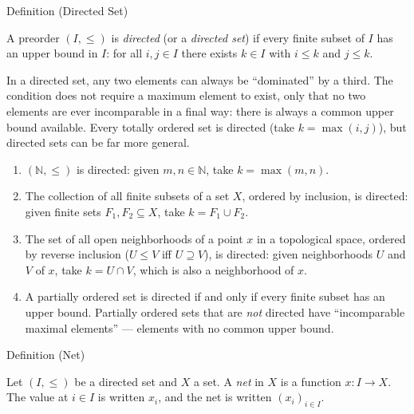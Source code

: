 \begin{definitionbox}{Definition (Directed Set)}
\begin{definition}\label{def:directed-set}
A preorder $(I, \leq)$ is \emph{directed} (or a \emph{directed set}) if every
finite subset of $I$ has an upper bound in $I$: for all $i, j \in I$ there
exists $k \in I$ with $i \leq k$ and $j \leq k$.
\end{definition}
\end{definitionbox}

\begin{remark*}
In a directed set, any two elements can always be ``dominated'' by a third.
The condition does not require a maximum element to exist, only that no two
elements are ever incomparable in a final way: there is always a common
upper bound available. Every totally ordered set is directed (take $k =
\max(i,j)$), but directed sets can be far more general.
\end{remark*}

\begin{example*}
\begin{enumerate}[label=(\roman*)]
\item $(\mathbb{N}, \leq)$ is directed: given $m, n \in \mathbb{N}$, take
$k = \max(m,n)$.
\item The collection of all finite subsets of a set $X$, ordered by inclusion,
is directed: given finite sets $F_1, F_2 \subseteq X$, take $k = F_1 \cup
F_2$.
\item The set of all open neighborhoods of a point $x$ in a topological space,
ordered by reverse inclusion ($U \leq V$ iff $U \supseteq V$), is directed:
given neighborhoods $U$ and $V$ of $x$, take $k = U \cap V$, which is also
a neighborhood of $x$.
\item A partially ordered set is directed if and only if every finite subset
has an upper bound. Partially ordered sets that are \emph{not} directed have
``incomparable maximal elements'' — elements with no common upper bound.
\end{enumerate}
\end{example*}

\begin{definitionbox}{Definition (Net)}
\begin{definition}[Net]\label{def:net}
Let $(I, \leq)$ be a directed set and $X$ a set. A \emph{net} in $X$ is a
function $x : I \to X$. The value at $i \in I$ is written $x_i$, and the
net is written $(x_i)_{i \in I}$.
\end{definition}
\end{definitionbox}

